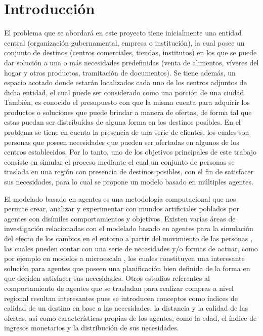 \documentclass[12pt]{amsart}
\begin{document}
\newpage
\section{Introducci\'on}
El problema que se abordará en este proyecto tiene inicialmente una entidad central (organización gubernamental, empresa o institución), la cual posee un conjunto de destinos (centros comerciales, tiendas, institutos) en los que se puede dar solución a una o más necesidades predefinidas (venta de alimentos, víveres del hogar y otros productos, tramitación de documentos). Se tiene además, un espacio acotado donde estarán localizados cada uno de los centros adjuntos de dicha entidad, el cual puede ser considerado como una porción de una ciudad. También, es conocido el presupuesto con que la misma cuenta para adquirir los productos o soluciones que puede brindar a manera de ofertas, de forma tal que estas puedan ser distribuídas de alguna forma en los destinos posibles. En el problema se tiene en cuenta la presencia de una serie de clientes, los cuales son personas que poseen necesidades que pueden ser ofertadas en algunos de los centros establecidos. Por lo tanto, uno de los objetivos principales de este trabajo consiste en simular el proceso mediante el cual un conjunto de personas se traslada en una región con presencia de destinos posibles, con el fin de satisfacer sus necesidades, para lo cual se propone un modelo basado en múltiples agentes.

	El modelado basado en agentes es una metodología computacional que nos permite crear, analizar y experimentar con mundos artificiales poblados por agentes con disímiles comportamientos y objetivos. Existen varias áreas de investigación relacionadas con el modelado basado en agentes para la simulación del efecto de los cambios en el entorno a partir del movimiento de las personas \cite{soa1} \cite{soa2}, las cuales pueden contar con una serie de necesidades y/o formas de actuar, como por ejemplo en modelos a microescala \cite{soa3} \cite{soa4}, los cuales constituyen una interesante solución para agentes que poseen una planificación bien definida de la forma en que deciden satisfacer sus necesidades. Otros estudios referentes al comportamiento de agentes que se trasladan para realizar compras a nivel regional \cite{soa5} resultan interesantes pues se introducen conceptos como índices de calidad de un destino en base a las necesidades, la distancia y la calidad de las ofertas, así como características propias de los agentes, como la edad, el índice de ingresos monetarios y la distribución de sus necesidades.
\end{document}
